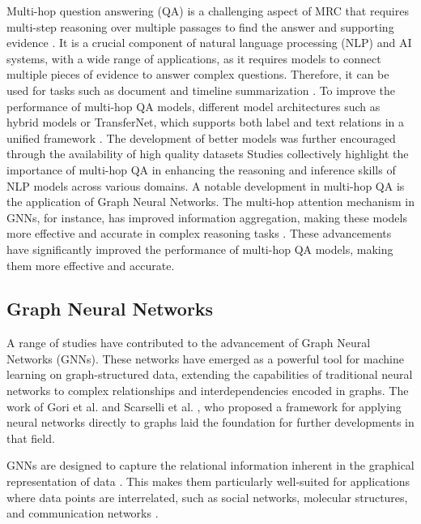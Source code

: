 \documentclass[sigplan,screen,nonacm]{acmart}
\begin{document}
Multi-hop question answering (QA) is a challenging aspect of MRC that requires multi-step reasoning over multiple passages to find the answer 
and supporting evidence \cite{RN165}. It is a crucial component of natural language processing (NLP) and AI systems, with a wide range of applications, 
as it requires models to connect multiple pieces of evidence to answer complex questions. Therefore, it can be used for tasks such as document 
and timeline summarization \cite{RN202, RN201}. To improve the performance of multi-hop QA models, different model architectures such 
as hybrid models or TransferNet, which supports both label and text relations in a unified framework \cite{RN164, RN133}. 
The development of better models was further encouraged through the availability of high quality datasets \cite{RN116, RN115}
Studies collectively highlight the importance of multi-hop QA in enhancing the reasoning and inference skills of NLP models across various domains. 
A notable development in multi-hop QA is the application of Graph Neural Networks. The multi-hop attention mechanism in GNNs, for instance, 
has improved information aggregation, making these models more effective and accurate in complex reasoning tasks \cite{RN109}. These advancements 
have significantly improved the performance of multi-hop QA models, making them more effective and accurate.

\subsection{Graph Neural Networks}

A range of studies have contributed to the advancement of Graph Neural Networks (GNNs). These networks have emerged 
as a powerful tool for machine learning on graph-structured data, extending the capabilities of traditional neural networks to complex relationships 
and interdependencies encoded in graphs. The work of Gori et al. \cite{RN203} and Scarselli et al. \cite{RN204}, who proposed a framework for 
applying neural networks directly to graphs laid the foundation for further developments in that field.

GNNs are designed to capture the relational information inherent in the graphical representation of data \cite{RN205}. This makes them particularly 
well-suited for applications where data points are interrelated, such as social networks, molecular structures, and communication networks \cite{RN206}.
\end{document}
